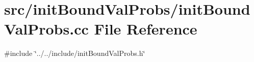 \section{src/init\+Bound\+Val\+Probs/init\+Bound\+Val\+Probs.cc File Reference}
\label{init_bound_val_probs_8cc}
{\ttfamily \#include \char`\"{}../../include/init\+Bound\+Val\+Probs.\+h\char`\"{}}\newline
